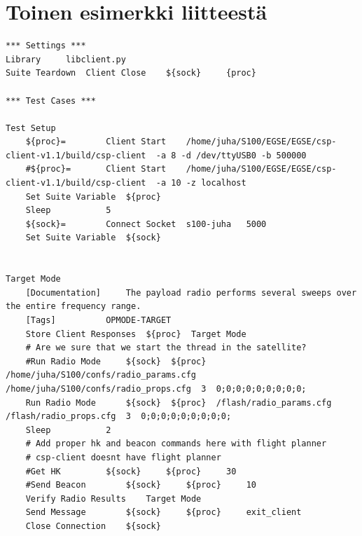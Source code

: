 \documentclass[english,12pt,a4paper,pdftex,elec,utf8]{aaltothesis}
\begin{document}
\section{Toinen esimerkki liitteest\"a\label{LiiteB}}
\begin{lstlisting}
*** Settings ***
Library		libclient.py
Suite Teardown	Client Close	${sock}		{proc}

*** Test Cases ***

Test Setup
	${proc}=		Client Start	/home/juha/S100/EGSE/EGSE/csp-client-v1.1/build/csp-client	-a 8 -d /dev/ttyUSB0 -b 500000
	#${proc}=		Client Start	/home/juha/S100/EGSE/EGSE/csp-client-v1.1/build/csp-client	-a 10 -z localhost
	Set Suite Variable	${proc}
	Sleep			5
	${sock}=		Connect Socket	s100-juha	5000
	Set Suite Variable	${sock}


Target Mode
	[Documentation]		The payload radio performs several sweeps over the entire frequency range.
	[Tags]			OPMODE-TARGET
	Store Client Responses	${proc}	 Target Mode
	# Are we sure that we start the thread in the satellite?
	#Run Radio Mode		${sock}  ${proc}  /home/juha/S100/confs/radio_params.cfg  /home/juha/S100/confs/radio_props.cfg  3  0;0;0;0;0;0;0;0;0;
	Run Radio Mode		${sock}  ${proc}  /flash/radio_params.cfg  /flash/radio_props.cfg  3  0;0;0;0;0;0;0;0;0;
	Sleep			2
	# Add proper hk and beacon commands here with flight planner
	# csp-client doesnt have flight planner
	#Get HK			${sock}		${proc}		30
	#Send Beacon		${sock}		${proc}		10	
	Verify Radio Results	Target Mode
	Send Message		${sock}		${proc}		exit_client
	Close Connection	${sock}

\end{lstlisting}
\end{document}
